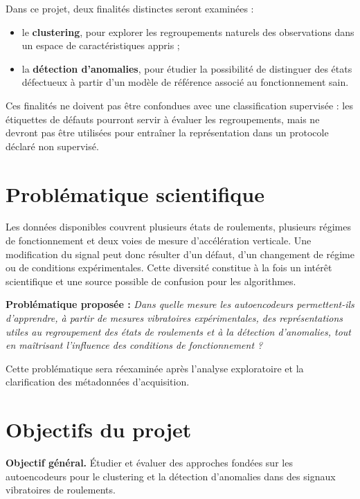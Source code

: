 Dans ce projet, deux finalités distinctes seront examinées :
\begin{itemize}
  \item le \textbf{clustering}, pour explorer les regroupements naturels des observations dans un espace de caractéristiques appris ;
  \item la \textbf{détection d'anomalies}, pour étudier la possibilité de distinguer des états défectueux à partir d'un modèle de référence associé au fonctionnement sain.
\end{itemize}

Ces finalités ne doivent pas être confondues avec une classification supervisée : les étiquettes de défauts pourront servir à évaluer les regroupements, mais ne devront pas être utilisées pour entraîner la représentation dans un protocole déclaré non supervisé.

\section{Problématique scientifique}
Les données disponibles couvrent plusieurs états de roulements, plusieurs régimes de fonctionnement et deux voies de mesure d'accélération verticale. Une modification du signal peut donc résulter d'un défaut, d'un changement de régime ou de conditions expérimentales. Cette diversité constitue à la fois un intérêt scientifique et une source possible de confusion pour les algorithmes.

\begin{encadreinfo}
\textbf{Problématique proposée :}
\emph{Dans quelle mesure les autoencodeurs permettent-ils d'apprendre, à partir de mesures vibratoires expérimentales, des représentations utiles au regroupement des états de roulements et à la détection d'anomalies, tout en maîtrisant l'influence des conditions de fonctionnement ?}
\end{encadreinfo}

Cette problématique sera réexaminée après l'analyse exploratoire et la clarification des métadonnées d'acquisition.

\section{Objectifs du projet}
\textbf{Objectif général.} Étudier et évaluer des approches fondées sur les autoencodeurs pour le clustering et la détection d'anomalies dans des signaux vibratoires de roulements.

